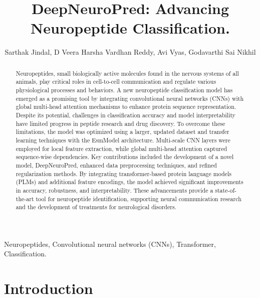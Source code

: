 \documentclass[conference]{IEEEtran}
\begin{document}
\title{\LARGE  DeepNeuroPred: Advancing Neuropeptide Classification.}
\author{
    Sarthak Jindal, D Veera Harsha Vardhan Reddy, Avi Vyas, Godavarthi Sai Nikhil
    
}
\maketitle
\begin{abstract}

Neuropeptides, small biologically active molecules found in the nervous systems of all animals, play critical roles in cell-to-cell communication and regulate various physiological processes and behaviors. A new neuropeptide classification model has emerged as a promising tool by integrating convolutional neural networks (CNNs) with global multi-head attention mechanisms to enhance protein sequence representation. Despite its potential, challenges in classification accuracy and model interpretability have limited progress in peptide research and drug discovery. To overcome these limitations, the model was optimized using a larger, updated dataset and transfer learning techniques with the EsmModel architecture. Multi-scale CNN layers were employed for local feature extraction, while global multi-head attention captured sequence-wise dependencies. Key contributions included the development of a novel model, DeepNeuroPred, enhanced data preprocessing techniques, and refined regularization methods. By integrating transformer-based protein language models (PLMs) and additional feature encodings, the model achieved significant improvements in accuracy, robustness, and interpretability. These advancements provide a state-of-the-art tool for neuropeptide identification, supporting neural communication research and the development of treatments for neurological disorders.

\end{abstract}

\IEEEoverridecommandlockouts

\begin{keywords}
Neuropeptides, Convolutional neural networks (CNNs), Transformer, Classification.
\end{keywords}

\IEEEpeerreviewmaketitle

\section{Introduction}
\end{document}
